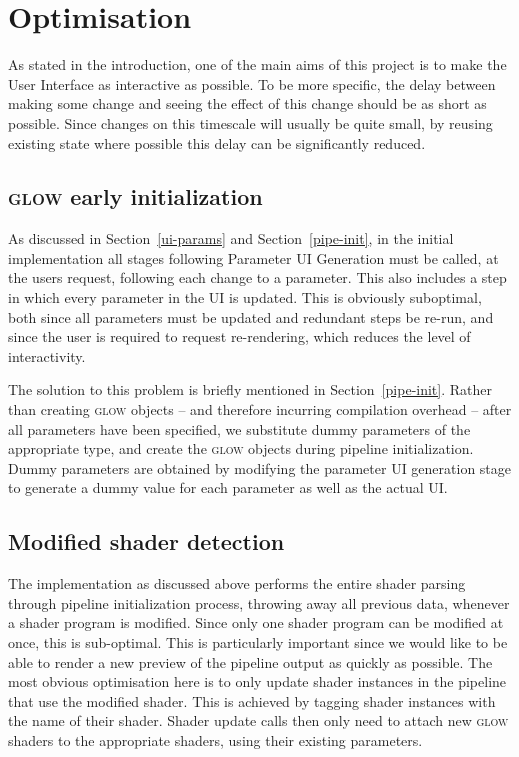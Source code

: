 \documentclass[12pt,twoside,notitlepage]{report}
\begin{document}
\section{Optimisation}
\label{opt}
As stated in the introduction, one of the main aims of this project is to make the User Interface as interactive as possible. To be more specific, the delay between making some change and seeing the effect of this change should be as short as possible. Since changes on this timescale will usually be quite small, by reusing existing state where possible this delay can be significantly reduced.

\subsection{\textsc{glow} early initialization}
As discussed in Section~\ref{ui-params} and Section~\ref{pipe-init}, in the initial implementation all stages following Parameter UI Generation must be called, at the users request, following each change to a parameter. This also includes a step in which every parameter in the UI is updated. This is obviously suboptimal, both since all parameters must be updated and redundant steps be re-run, and since the user is required to request re-rendering, which reduces the level of interactivity.

The solution to this problem is briefly mentioned in Section~\ref{pipe-init}. Rather than creating \textsc{glow} objects -- and therefore incurring compilation overhead -- after all parameters have been specified, we substitute dummy parameters of the appropriate type, and create the \textsc{glow} objects during pipeline initialization. Dummy parameters are obtained by modifying the parameter UI generation stage to generate a dummy value for each parameter as well as the actual UI.

\subsection{Modified shader detection}
\label{msd}
The implementation as discussed above performs the entire shader parsing through pipeline initialization process, throwing away all previous data, whenever a shader program is modified. Since only one shader program can be modified at once, this is sub-optimal. This is particularly important since we would like to be able to render a new preview of the pipeline output as quickly as possible. The most obvious optimisation here is to only update shader instances in the pipeline that use the modified shader. This is achieved by tagging shader instances with the name of their shader. Shader update calls then only need to attach new \textsc{glow} shaders to the appropriate shaders, using their existing parameters.
\end{document}

